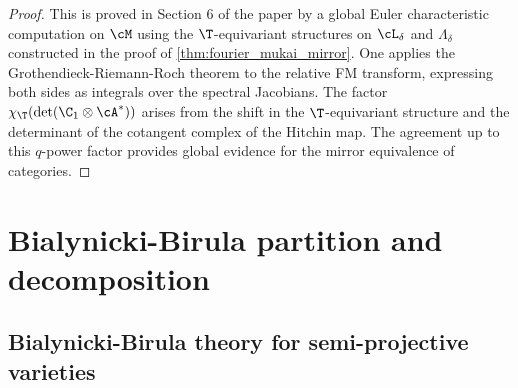 \begin{proof}
  This is proved in Section 6 of the paper by a global Euler characteristic computation on
  \(\cM\) using the \(\T\)-equivariant structures on \(\cL_\delta\) and \(\Lambda_\delta\)
  constructed in the proof of \cref{thm:fourier_mukai_mirror}.  One applies the
  Grothendieck-Riemann-Roch theorem to the relative FM transform, expressing both sides as
  integrals over the spectral Jacobians.  The factor \(\chi_{\T}(\det(\C_1 \otimes \cA^*))\)
  arises from the shift in the \(\T\)-equivariant structure and the determinant of the
  cotangent complex of the Hitchin map.  The agreement up to this \(q\)-power factor provides
  global evidence for the mirror equivalence of categories.
\end{proof}

\section{Bialynicki-Birula partition and decomposition}

\subsection{Bialynicki-Birula theory for semi-projective varieties}

